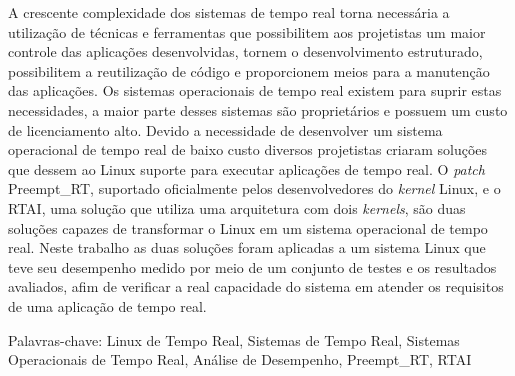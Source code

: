 A crescente complexidade dos sistemas de tempo real torna necessária a utilização de técnicas e ferramentas que possibilitem aos projetistas um maior controle das aplicações desenvolvidas, tornem o desenvolvimento estruturado, possibilitem a reutilização de código e proporcionem meios para a manutenção das aplicações. Os sistemas operacionais de tempo real existem para suprir estas necessidades, a maior parte desses sistemas são proprietários e possuem um custo de licenciamento alto. Devido a necessidade de desenvolver um sistema operacional de tempo real de baixo custo diversos projetistas criaram soluções que dessem ao Linux suporte para executar aplicações de tempo real. O \textit{patch} Preempt\_RT, suportado oficialmente pelos desenvolvedores do \textit{kernel} Linux, e o RTAI, uma solução que utiliza uma arquitetura com dois \textit{kernels}, são duas soluções capazes de transformar o Linux em um sistema operacional de tempo real. Neste trabalho as duas soluções foram aplicadas a um sistema Linux que teve seu desempenho medido por meio de um conjunto de testes e os resultados avaliados, afim de verificar a real capacidade do sistema em atender os requisitos de uma aplicação de tempo real.   

\noindent Palavras-chave: Linux de Tempo Real, Sistemas de Tempo Real, Sistemas Operacionais de Tempo Real, Análise de Desempenho, Preempt\_RT, RTAI
